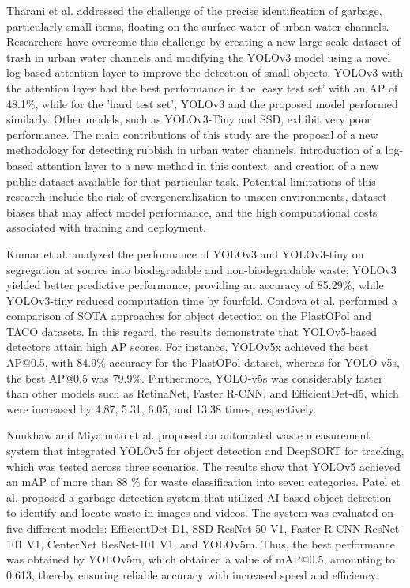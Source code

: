 \documentclass{ieeeaccess}
\begin{document}
Tharani et al. \cite{Tharani2021TrashDO} addressed the challenge of the precise identification of garbage, particularly small items, floating on the surface water of urban water channels. Researchers have overcome this challenge by creating a new large-scale dataset of trash in urban water channels and modifying the YOLOv3 model using a novel log-based attention layer to improve the detection of small objects. YOLOv3 with the attention layer had the best performance in the 'easy test set' with an AP of 48.1\%, while for the 'hard test set', YOLOv3 and the proposed model performed similarly. Other models, such as YOLOv3-Tiny and SSD, exhibit very poor performance. The main contributions of this study are the proposal of a new methodology for detecting rubbish in urban water channels, introduction of a log-based attention layer to a new method in this context, and creation of a new public dataset available for that particular task. Potential limitations of this research include the risk of overgeneralization to unseen environments, dataset biases that may affect model performance, and the high computational costs associated with training and deployment.

Kumar et al. \cite{Kumar2020ANY} analyzed the performance of YOLOv3 and YOLOv3-tiny on segregation at source into biodegradable and non-biodegradable waste; YOLOv3 yielded better predictive performance, providing an accuracy of 85.29\%, while YOLOv3-tiny reduced computation time by fourfold. Cordova et al. \cite{Neira2022LitterDW} performed a comparison of SOTA approaches for object detection on the PlastOPol and TACO datasets. In this regard, the results demonstrate that YOLOv5-based detectors attain high AP scores. For instance, YOLOv5x achieved the best AP@0.5, with 84.9\% accuracy for the PlastOPol dataset, whereas for YOLO-v5s, the best AP@0.5 was 79.9\%. Furthermore, YOLO-v5s was considerably faster than other models such as RetinaNet, Faster R-CNN, and EfficientDet-d5, which were increased by 4.87, 5.31, 6.05, and 13.38 times, respectively.

Nunkhaw and Miyamoto et al. \cite{Nunkhaw2024AnIA} proposed an automated waste measurement system that integrated YOLOv5 for object detection and DeepSORT for tracking, which was tested across three scenarios. The results show that YOLOv5 achieved an mAP of more than 88 \% for waste classification into seven categories. Patel et al. \cite{Patel2021GarbageDU} proposed a garbage-detection system that utilized AI-based object detection to identify and locate waste in images and videos. The system was evaluated on five different models: EfficientDet-D1, SSD ResNet-50 V1, Faster R-CNN ResNet-101 V1, CenterNet ResNet-101 V1, and YOLOv5m. Thus, the best performance was obtained by YOLOv5m, which obtained a value of mAP@0.5, amounting to 0.613, thereby ensuring reliable accuracy with increased speed and efficiency.
\end{document}
